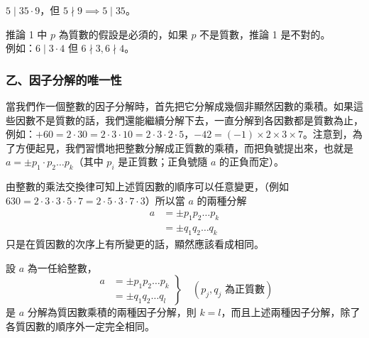 \begin{example}\label{ex:6-3-1}
$5 \mid 35 \cdot 9$，但 $5 \nmid 9 \implies 5 \mid 35$。
\end{example}

\begin{example}\label{ex:6-3-2}
推論 1 中 $p$ 為質數的假設是必須的，如果 $p$ 不是質數，推論 1 是不對的。\\
例如：$6 \mid 3 \cdot 4$ 但 $6 \nmid 3, 6 \nmid 4$。
\end{example}

\subsubsection*{乙、因子分解的唯一性}\label{subsec:6-3-b}

當我們作一個整數的因子分解時，首先把它分解成幾個非顯然因數的乘積。如果這些因數不是質數的話，我們還能繼續分解下去，一直分解到各因數都是質數為止，例如：$+60 = 2 \cdot 30 = 2 \cdot 3 \cdot 10 = 2 \cdot 3 \cdot 2 \cdot 5$，$-42 = (-1) \times 2 \times 3 \times 7$。注意到，為了方便起見，我們習慣地把整數分解成正質數的乘積，而把負號提出來，也就是 $a = \pm p_1 \cdot p_2 \dots p_k$（其中 $p_i$ 是正質數；正負號隨 $a$ 的正負而定）。

由整數的乘法交換律可知上述質因數的順序可以任意變更，（例如 $630 = 2 \cdot 3 \cdot 3 \cdot 5 \cdot 7 = 2 \cdot 5 \cdot 3 \cdot 7 \cdot 3$）所以當 $a$ 的兩種分解
\begin{align*}
  a &= \pm p_1 p_2 \dots p_k \\
    &= \pm q_1 q_2 \dots q_k
\end{align*}
只是在質因數的次序上有所變更的話，顯然應該看成相同。

\begin{theorem}[因子分解的唯一性]\label{thm:fundamental_arithmetic}
設 $a$ 為一任給整數，
\begin{equation}
  \left. \begin{aligned}
    a &= \pm p_1 p_2 \dots p_k \\
      &= \pm q_1 q_2 \dots q_l
  \end{aligned} \right\} \quad (p_j, q_j \text{ 為正質數}) \label{eq:unique_factorization}
\end{equation}
是 $a$ 分解為質因數乘積的兩種因子分解，則 $k=l$，而且上述兩種因子分解，除了各質因數的順序外一定完全相同。
\end{theorem}

